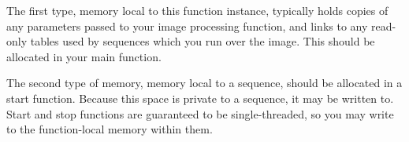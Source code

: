 The first type, memory local to this function instance, typically holds
copies of any parameters passed to your image processing function, and links
to any read-only tables used by sequences which you run over the image. This
should be allocated in your main function.

The second type of memory, memory local to a sequence, should be allocated
in a start function. Because this space is private to a sequence, it may be
written to. Start and stop functions are guaranteed
to be single-threaded, so you may write to the function-local memory within 
them.

